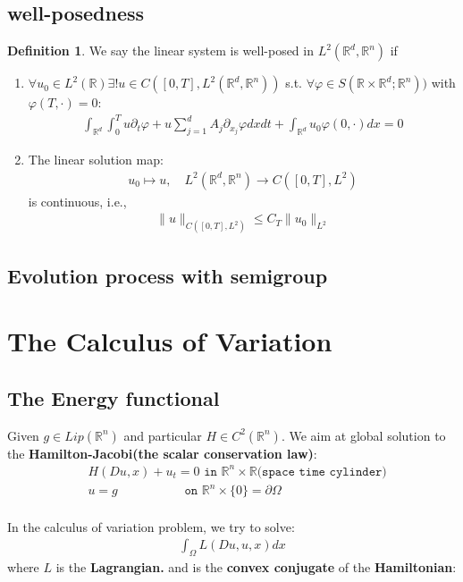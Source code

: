 \documentclass[a4paper,11pt,oneside,fleqn]{book}
\theoremstyle{definition}
\newtheorem{definition}{Definition}[section]
\theoremstyle{remark}
\begin{document}
\subsection{well-posedness}
\begin{definition}
	We say the linear system is well-posed in $L^2(\mathbb{R}^d, \mathbb{R}^n)$ if
	\begin{enumerate}
		\item $\forall u_0 \in L^2(\mathbb{R}) \exists ! u \in C([0, T], L^2(\mathbb{R}^d, \mathbb{R}^n))$ s.t. $\forall \varphi \in S(\mathbb{R} \times \mathbb{R}^d ; \mathbb{R}^n))$ with $\varphi(T, \cdot) = 0$:
		\begin{align*}
			\int_{\mathbb{R}^d}\int_0^T u \partial_t \varphi   +  u \sum_{j = 1}^d A_j \partial_{x_j} \varphi dx dt + \int_{\mathbb{R}^d} u_0 \varphi(0, \cdot) dx = 0
		\end{align*}
		\item The linear solution map:
		\begin{align*}
			u_0 \mapsto u, \quad L^2(\mathbb{R}^d, \mathbb{R}^n) \rightarrow C([0, T], L^2)
		\end{align*}
		is continuous, i.e., 
		\begin{align*}
			\|u\|_{C([0, T], L^2)} \le C_T \|u_0\|_{L^2}
		\end{align*}
	\end{enumerate}
\end{definition} 


\subsection{Evolution process with semigroup}

\section{The Calculus of Variation}

\subsection{The Energy functional}




Given $g \in Lip(\mathbb{R}^n)$ and particular $H \in C^2(\mathbb{R}^n)$. We aim at global solution to the \textbf{Hamilton-Jacobi(the scalar conservation law)}:
\begin{align*}
	&H(Du, x) + u_t = 0 \texttt{ in } \mathbb{R}^n \times \mathbb{R}(\texttt{space time cylinder)}\\
	&u = g \qquad \qquad \quad \texttt{ on } \mathbb{R}^n \times \{0\} = \partial\Omega
\end{align*}
\quad\\
In the calculus of variation problem, we try to solve:
\begin{align*}
	\int_\Omega L(Du, u, x) dx
\end{align*}
where $L$ is the \textbf{Lagrangian.} and is the  \textbf{convex conjugate} of the \textbf{Hamiltonian}:
\end{document}
